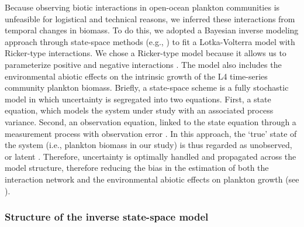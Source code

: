 \documentclass[12pt]{article}
\begin{document}
Because observing biotic interactions in open-ocean plankton communities is unfeasible for logistical and technical reasons, we inferred these interactions from temporal changes in biomass. To do this, we adopted a Bayesian inverse modeling approach through state-space methods (e.g., \citealp{Mutshinda2011,Almaraz2024}) to fit a Lotka-Volterra model with Ricker-type interactions. We chose a Ricker-type model because it allows us to parameterize positive and negative interactions \citep{mayfield2017}. The model also includes the environmental abiotic effects on the intrinsic growth of the L4 time-series community plankton biomass. Briefly, a state-space scheme is a fully stochastic model in which uncertainty is segregated into two equations. First, a state equation, which models the system under study with an associated process variance. Second, an observation equation, linked to the state equation through a measurement process with observation error \citep{Clark2004,Mutshinda2011,Almaraz2024}. In this approach, the `true' state of the system (i.e., plankton biomass in our study) is thus regarded as unobserved, or latent \citep{Durbin2001}. Therefore, uncertainty is optimally handled and propagated across the model structure, therefore reducing the bias in the estimation of both the interaction network and the environmental abiotic effects on plankton growth (see \citep{Mutshinda2009,Mutshinda2011,Almaraz2024}).

\subsubsection*{Structure of the inverse state-space model}
\end{document}
